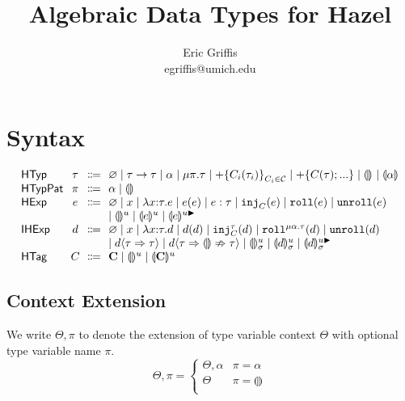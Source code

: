 \documentclass{article}
\title{Algebraic Data Types for Hazel}
\author{Eric Griffis \\ egriffis@umich.edu}
\date{}
\let\originalleft\left
\let\originalright\right
\renewcommand{\left}{\mathopen{}\mathclose\bgroup\originalleft}
\renewcommand{\right}{\aftergroup\egroup\originalright}
\newcommand\Sort[1]{\mathsf{#1}}
\newcommand\IHExp{\Sort{IHExp}}
\newcommand\HExp{\Sort{HExp}}
\newcommand\HTag{\Sort{HTag}}
\newcommand\HTyp{\Sort{HTyp}}
\newcommand\HTypPat{\Sort{HTypPat}}
\newcommand\hole[2][]{\llparenthesis#1\rrparenthesis^{#2}}
\newcommand\mhole[2][]{\llparenthesis#1\rrparenthesis^{#2 \blacktriangleright}}
\newcommand\dhole[3][]{\llparenthesis#1\rrparenthesis_{#2}^{#3}}
\newcommand\dmhole[3][]{\llparenthesis#1\rrparenthesis_{#2}^{#3 \blacktriangleright}}
\newcommand\shole{...}
\newcommand\Tarr[2]{#1 \rightarrow #2}
\newcommand\Trec[2]{\mu{#1}.{#2}}
\newcommand\Tsum[1]{+\mathopen{}\left\{#1\right\}}
\newcommand\Tag{\mathbf{C}}
\newcommand\TagSet{\mathcal{C}}
\newcommand\TagHole[2][]{\hole[#1]{#2}}
\newcommand\Unit{\varnothing}
\newcommand\literal[1]{\mathtt{#1}}
\newcommand\asc[2]{{#1}:{#2}}
\newcommand\Efun[3]{\lambda{#1}{:}{#2}.{#3}}
\newcommand\Eapp[2]{{#1}\left({#2}\right)}
\newcommand\Einj[2]{\literal{inj}_{#1}\left({#2}\right)}
\newcommand\Ecase[2]{\literal{case} \left({#1}\right) \left\{{#2}\right\}}
\newcommand\Eroll[1]{\literal{roll}\left(#1\right)}
\newcommand\Eunroll[1]{\literal{unroll}\left(#1\right)}
\newcommand\Dfun[3]{\lambda{#1}{:}{#2}.{#3}}
\newcommand\Dapp[2]{{#1}\left({#2}\right)}
\newcommand\Dinj[3]{\literal{inj}_{#1}^{#2}\left({#3}\right)}
\newcommand\Dcase[2]{\literal{case} \left({#1}\right) \left\{{#2}\right\}}
\newcommand\Droll[3]{\literal{roll}^{\Trec{#1}{#2}}\left({#3}\right)}
\newcommand\Dunroll[1]{\literal{unroll}\left(#1\right)}
\newcommand\cast[3]{{#1}\langle{#2}\Rightarrow{#3}\rangle}
\newcommand\failedcast[3]{{#1}\langle{#2}\Rightarrow{\llparenthesis\rrparenthesis}\nRightarrow{#3}\rangle}
\begin{document}
\maketitle


\section{Syntax}

\[
  \arraycolsep=0pt
  \begin{array}{l@{~~}c@{~~}c@{~~}l}
    \HTyp & \tau & \Coloneqq &
      \Unit
      \mid \Tarr{\tau}{\tau}
      \mid \alpha
      \mid \Trec{\pi}{\tau}
      \mid \Tsum{C_i(\tau_i)}_{C_i \in \TagSet}
      \mid \Tsum{C(\tau); \shole}
      \mid \hole{}
      \mid \hole[\alpha]{}
      \\
    \HTypPat & \pi & \Coloneqq & \alpha \mid \hole{} \\
    \HExp & e & \Coloneqq &
      \Unit
      \mid x
      \mid \Efun{x}{\tau}{e}
      \mid \Eapp{e}{e}
      \mid \asc{e}{\tau}
      \mid \Einj{C}{e}
      \mid \Eroll{e}
      \mid \Eunroll{e}
      \\ & & &
      \mid \hole{u}
      \mid \hole[e]{u}
      \mid \mhole[e]{u}
      \\
    \IHExp & d & \Coloneqq &
      \Unit
      \mid x
      \mid \Dfun{x}{\tau}{d}
      \mid \Dapp{d}{d}
      \mid \Dinj{C}{\tau}{d}
      \mid \Droll{\alpha}{\tau}{d}
      \mid \Dunroll{d}
      \\ & & &
      \mid \cast{d}{\tau}{\tau}
      \mid \failedcast{d}{\tau}{\tau}
      \mid \dhole{\sigma}{u}
      \mid \dhole[d]{\sigma}{u}
      \mid \dmhole[d]{\sigma}{u}
      \\
    \HTag & C & \Coloneqq &
      \Tag
      \mid \TagHole{u}
      \mid \TagHole[\Tag]{u}
      \\
  \end{array}
\]


\subsection{Context Extension}

We write $\Theta, \pi$ to denote the extension of type variable context $\Theta$ with optional type variable name $\pi$.
\[
  \Theta, \pi = \begin{cases}
    \Theta, \alpha & \pi = \alpha \\
    \Theta & \pi = \hole{} \\
  \end{cases}
\]
\end{document}
